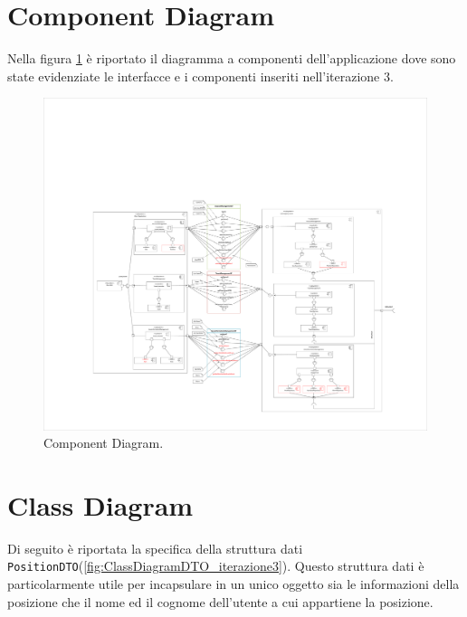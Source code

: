 \section{Component Diagram}
Nella figura \ref{fig:ComponentDiagram_iterazione3} è riportato il diagramma a componenti dell'applicazione dove sono state evidenziate le interfacce e i componenti inseriti nell'iterazione 3. 
\begin{figure}[h!]
	\centering
	\includegraphics[width=1\linewidth]{./Iterazione 3/OtherFiles/UML - Component view}
	\caption{Component Diagram.}
	\label{fig:ComponentDiagram_iterazione3}
\end{figure}

\clearpage

\section{Class Diagram}
Di seguito è riportata la specifica della struttura dati \texttt{PositionDTO}(\Fig\ref{fig:ClassDiagramDTO_iterazione3}). Questo struttura dati è particolarmente utile per incapsulare in un unico oggetto sia le informazioni della posizione che il nome ed il cognome dell'utente a cui appartiene la posizione.

